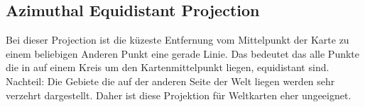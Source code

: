 \subsection{Azimuthal Equidistant Projection}
\label{sec:azimuequi}
Bei dieser Projection ist die küzeste Entfernung vom Mittelpunkt der Karte zu einem beliebigen Anderen Punkt
eine gerade Linie. Das bedeutet das alle Punkte die in auf einem Kreis um den Kartenmittelpunkt liegen, equidistant sind.
Nachteil:\newline
Die Gebiete die auf der anderen Seite der Welt liegen werden sehr verzehrt dargestellt. Daher ist diese Projektion für Weltkarten 
eher ungeeignet.
